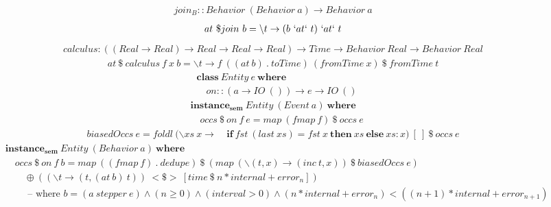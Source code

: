 \documentclass[fleqn]{amsart}
\begin{document}
\begin{align*}
  join_B :: Behavior\ (Behavior\ a) \rightarrow Behavior\ a
\end{align*}
\begin{align*}
  at\ \$join\ b =\backslash t \rightarrow (b\ `at` \ t)\ `at` \ t
\end{align*}
\begin{align*}
  calculus : ((Real \rightarrow Real) \rightarrow Real \rightarrow Real \rightarrow Real) \rightarrow Time \rightarrow Behavior\ Real\rightarrow Behavior\ Real
\end{align*}
\begin{align*}
  at\ \$\ calculus\ f\ x\ b = \backslash t\rightarrow f\ ((at\ b)\ .\ toTime)\ (fromTime\ x)\ \$\ fromTime\ t
\end{align*}
\begin{align*}
  &\mathbf{class}\ Entity\ e\ \mathbf{where}\\
  &\quad on :: (a\rightarrow IO\ ())\rightarrow e \rightarrow IO\ ()
\end{align*}
\begin{align*}
  &\mathbf{instance_{sem}}\ Entity\ (Event\ a)\ \mathbf{where}\\
  &\quad occs\ \$\ on\ f\ e = map\ (fmap\ f)\ \$\ occs\ e
\end{align*}
\begin{align*}
  biasedOccs\ e = foldl\ (\backslash xs\ x\rightarrow\ &\mathbf{if}\ fst\ (last\ xs) = fst\ x\ \mathbf{then}\ xs\ \mathbf{else}\ xs : x)\ [\ ]\ \$\ occs\ e
\end{align*}
\begin{align*}
  &\mathbf{instance_{sem}}\ Entity\ (Behavior\ a)\ \mathbf{where}\\
  &\quad occs\ \$\ on\ f\ b = map\ ((fmap\ f)\ .\ dedupe)\ \$\ (map\ (\backslash (t, x)\rightarrow(inc\ t, x))\ \$\ biasedOccs\ e)\\
  &\qquad\oplus((\backslash t\rightarrow (t, (at\ b)\ t))\ {<}\${>}\ [time\ \$\ n * internal + error_n])\\
  &\qquad\text{ -- where }b = (a\ stepper\ e)\wedge (n\geq 0)\wedge (interval > 0)\wedge (n * internal + error_n) < ((n + 1) * internal + error_{n+1})
\end{align*}
\end{document}

